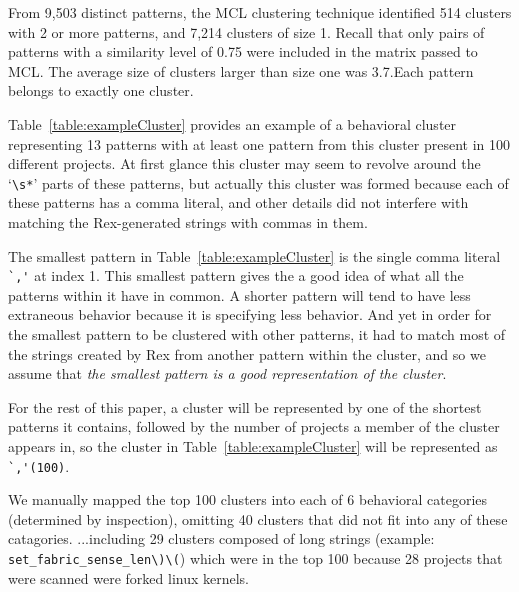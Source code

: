From 9,503 distinct patterns, the MCL clustering technique identified 514 clusters with 2 or more patterns, and 7,214 clusters of size 1.  Recall that only pairs of patterns with a similarity level of 0.75 were included in the matrix passed to MCL.  The average size of clusters larger than size one was 3.7.Each pattern belongs to exactly one cluster.

Table~\ref{table:exampleCluster} provides an example of a behavioral cluster representing 13 patterns with at least one pattern from this cluster present in 100 different projects.  At first glance this cluster may seem to revolve around the `\verb!\s*!' parts of these patterns, but actually this cluster was formed because each of these patterns has a comma literal, and other details did not interfere with matching the Rex-generated strings with commas in them.


The smallest pattern in Table~\ref{table:exampleCluster} is the single comma literal \verb!`,'! at index 1.  This smallest pattern gives the a good idea of what all the patterns within it have in common.  A shorter pattern will tend to have less extraneous behavior because it is specifying less behavior.  And yet in order for the smallest pattern to be clustered with other patterns, it had to match most of the strings created by Rex from another pattern within the cluster, and so we assume that \emph{the smallest pattern is a good representation of the cluster}.

For the rest of this paper, a cluster will be represented by one of the shortest patterns it contains, followed by the number of projects a member of the cluster appears in, so the cluster in Table~\ref{table:exampleCluster} will be represented as \verb!`,'(100)!.

We  manually mapped the top 100 clusters into each of 6 behavioral categories (determined by inspection), omitting 40 clusters that did not fit into any of these catagories.
\leavevmode\color{gray}
 ...including 29 clusters composed of long strings (example: \verb!set_fabric_sense_len\)\(!) which were in the top 100 because 28 projects that were scanned were forked linux kernels.
\leavevmode\color{black}

